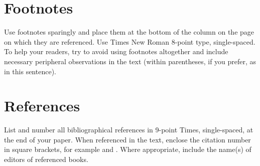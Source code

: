 \documentclass[10pt]{article}
\newcommand{\sansserifformat}[1]{\fontfamily{cmss}{ #1}}%
\begin{document}
\section{Footnotes}

      Use footnotes sparingly and place them at the bottom of the column on the page on which they are referenced. Use Times New Roman 8-point type, single-spaced. To help your readers, try to avoid using footnotes altogether and include necessary peripheral observations in the text (within parentheses, if you prefer, as in this sentence). 






\section{References} 

List and number all bibliographical references in 9-point Times, single-spaced, at the end of your paper. When referenced in the text, enclose the citation number in square brackets, for example \cite{Jones2015,Smith2015} and \cite{Smith2015}. Where appropriate, include the name(s) of editors of referenced books.




\end{document}

